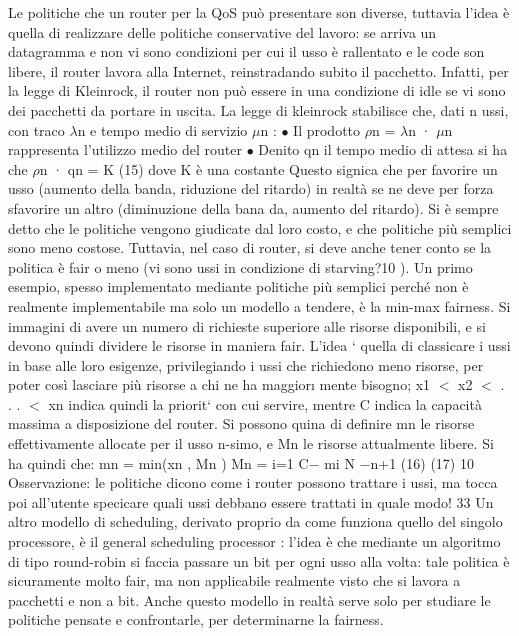 Le politiche che un router per la QoS può presentare son diverse, tuttavia
l'idea è quella di realizzare delle politiche conservative del lavoro: se arriva un
datagramma e non vi sono condizioni per cui il usso è rallentato e le code son
libere, il router lavora alla Internet, reinstradando subito il pacchetto. Infatti,
per la legge di Kleinrock, il router non può essere in una condizione di idle se
vi sono dei pacchetti da portare in uscita. La legge di kleinrock stabilisce che,
dati n ussi, con traco $\lambda$n e tempo medio di servizio $\mu$n :
$\bullet$ Il prodotto $\rho$n = $\lambda$n · $\mu$n rappresenta l'utilizzo medio del router
$\bullet$ Denito qn il tempo medio di attesa si ha che
$\rho$n · qn = K
(15)
dove K è una costante
Questo signica che per favorire un usso (aumento della banda, riduzione del
ritardo) in realtà se ne deve per forza sfavorire un altro (diminuzione della bana
da, aumento del ritardo).
Si è sempre detto che le politiche vengono giudicate dal loro costo, e che
politiche più semplici sono meno costose. Tuttavia, nel caso di router, si deve
anche tener conto se la politica è fair o meno (vi sono ussi in condizione di
starving?10 ).
Un primo esempio, spesso implementato mediante politiche più semplici
perché non è realmente implementabile ma solo un modello a tendere, è la
min-max fairness. Si immagini di avere un numero di richieste superiore alle
risorse disponibili, e si devono quindi dividere le risorse in maniera fair. L'idea
` quella di classicare i ussi in base alle loro esigenze, privilegiando i ussi che
richiedono meno risorse, per poter così lasciare più risorse a chi ne ha maggior\i{}
mente bisogno; x1 $<$ x2 $<$ . . . $<$ xn indica quindi la priorit` con cui servire,
mentre C indica la capacità massima a disposizione del router. Si possono quina
di definire mn le risorse effettivamente allocate per il usso n-simo, e Mn le
risorse attualmente libere. Si ha quindi che:
mn = min(xn , Mn )
Mn =
i=1
C$-$
mi
N $-$n+1
(16)
(17)
10 Osservazione: le politiche dicono come i router possono trattare i ussi, ma tocca poi
all'utente specicare quali ussi debbano essere trattati in quale modo!
33
Un altro modello di scheduling, derivato proprio da come funziona quello del
singolo processore, è il general scheduling processor : l'idea è che mediante un
algoritmo di tipo round-robin si faccia passare un bit per ogni usso alla volta:
tale politica è sicuramente molto fair, ma non applicabile realmente visto che
si lavora a pacchetti e non a bit. Anche questo modello in realtà serve solo per
studiare le politiche pensate e confrontarle, per determinarne la fairness.
